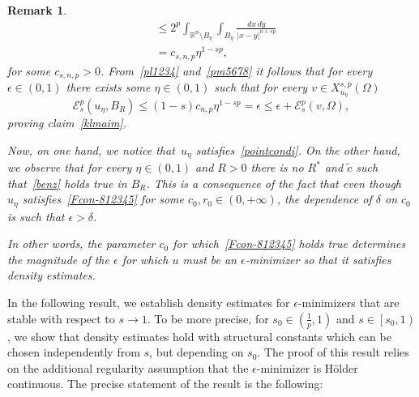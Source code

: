 \documentclass[12pt]{article}
\newcommand{\R}{\mathbb{R}}
\numberwithin{equation}{section}
\newtheorem{rem}[thm]{Remark}
\renewcommand{\leq}{\leqslant}
\begin{document}
\begin{rem}
\begin{equation}
\begin{split}
&\leq 2^p\int_{\R^n\setminus B_\eta}\int_{B_\eta}\frac{dx\,dy}{\left|x-y\right|^{n+sp}}\\
&=c_{s,n,p} \eta^{1-sp},
\end{split}
\end{equation}
for some $c_{s,n,p}>0$. From~\eqref{pl1234} and~\eqref{pm5678} it follows that for every $\epsilon\in (0,1)$ there exists some $\eta\in (0,1)$ such that for every $v\in X_{u_\eta}^{s,p}(\Omega)$
\begin{equation*}
\mathcal{E}_s^p\left(u_\eta,B_R\right)\leq (1-s)c_{n,p}\eta^{1-sp} = \epsilon\leq \epsilon+ \mathcal{E}_s^p(v,\Omega), 
\end{equation*} 
proving claim~\eqref{klmaim}. 

Now, on one hand, we notice that~$u_\eta$ satisfies~\eqref{pointcondi}. On the other hand, we observe that for every $\eta\in (0,1)$ and $R>0$ there is no $R^*$ and $\tilde{c}$ such that~\eqref{benz} holds true in $B_R$. This is a consequence of the fact that even though $u_\eta$ satisfies~\eqref{Fcon-812345} for some $c_0,r_0\in (0,+\infty)$, the dependence of $\delta$ on $c_0$ is such that $\epsilon>\delta$.   

In other words, the parameter $c_0$ for which~\eqref{Fcon-812345} holds true determines the magnitude of the $\epsilon$ for which $u$ must be an $\epsilon$-minimizer so that it satisfies density estimates. 
\end{rem}


In the following result, we establish density estimates for $\epsilon$-minimizers that are stable with respect to $s\to 1$. To be more precise, for $s_0\in \left(\frac{1}{p},1\right)$ and $s\in \left[s_0,1\right)$, we show that density estimates hold with structural constants which can be chosen independently from $s$, but depending on $s_0$.  The proof of this result relies on the additional regularity assumption that the $\epsilon$-minimizer is H\"older continuous. The precise statement of the result is the following:
\end{document}
